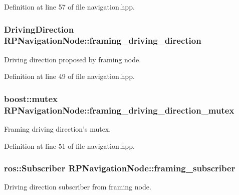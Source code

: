 \-Definition at line 57 of file navigation.\-hpp.

\hypertarget{class_r_p_navigation_node_a145cb04c28b99dadb0cfcbd20fa59704}{
\subsubsection[{framing\-\_\-driving\-\_\-direction}]{\setlength{\rightskip}{0pt plus 5cm}\-Driving\-Direction {\bf \-R\-P\-Navigation\-Node\-::framing\-\_\-driving\-\_\-direction}}}\label{class_r_p_navigation_node_a145cb04c28b99dadb0cfcbd20fa59704}
\-Driving direction proposed by framing node. 

\-Definition at line 49 of file navigation.\-hpp.

\hypertarget{class_r_p_navigation_node_a0345dfb701ca4033a46e7aff5dafe577}{
\subsubsection[{framing\-\_\-driving\-\_\-direction\-\_\-mutex}]{\setlength{\rightskip}{0pt plus 5cm}boost\-::mutex {\bf \-R\-P\-Navigation\-Node\-::framing\-\_\-driving\-\_\-direction\-\_\-mutex}}}\label{class_r_p_navigation_node_a0345dfb701ca4033a46e7aff5dafe577}
\-Framing driving direction's mutex. 

\-Definition at line 51 of file navigation.\-hpp.

\hypertarget{class_r_p_navigation_node_a3f09a98d40e698636c02f3ad915d91cf}{
\subsubsection[{framing\-\_\-subscriber}]{\setlength{\rightskip}{0pt plus 5cm}ros\-::\-Subscriber {\bf \-R\-P\-Navigation\-Node\-::framing\-\_\-subscriber}}}\label{class_r_p_navigation_node_a3f09a98d40e698636c02f3ad915d91cf}
\-Driving direction subscriber from framing node. 

